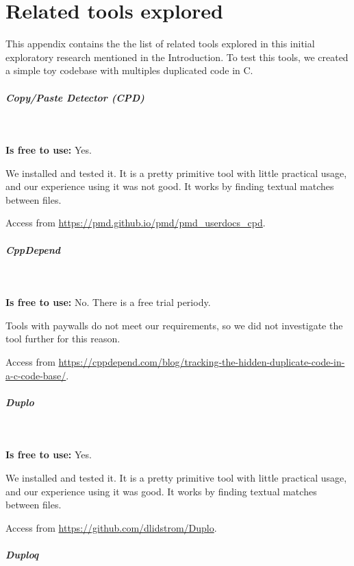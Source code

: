 \chapter{Related tools explored}

\label{app:gray}


This appendix contains the the list of related tools 
explored in this initial exploratory research mentioned
in the Introduction. To test this tools, we created a simple 
toy codebase with multiples duplicated code in C.

\paragraph{Copy/Paste Detector (CPD)} 

\

\textbf{Is free to use:} Yes.

We installed and tested it. It is a pretty primitive tool 
with little practical usage, and our experience using it 
was not good. It works by finding textual matches between files.

Access from \url{https://pmd.github.io/pmd/pmd_userdocs_cpd}.

\paragraph{CppDepend}

\

\textbf{Is free to use:} No. There is a free trial periody.

Tools with paywalls do not meet our requirements, 
so we did not investigate the tool further for this reason.

Access from 
\url{https://cppdepend.com/blog/tracking-the-hidden-duplicate-code-in-a-c-code-base/}.

\paragraph{Duplo}

\

\textbf{Is free to use:} Yes.

We installed and tested it. It is a pretty primitive tool 
with little practical usage, and our experience using it was good. 
It works by finding textual matches between files.

Access from
\url{https://github.com/dlidstrom/Duplo}.

\paragraph{Duploq}

